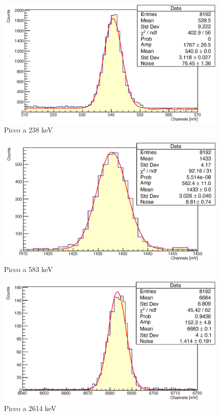 \documentclass[a4paper,10pt]{article}
\begin{document}
\begin{figure}[H]
    \centering
    \includegraphics[scale=0.45]{appendice/spettri/ThCu1_33}
    \caption{Picco a 238 keV}
\end{figure}
\begin{figure}[H]
    \centering
    \includegraphics[scale=0.45]{appendice/spettri/ThCu2_33}
    \caption{Picco a 583 keV}
\end{figure}
\begin{figure}[H]
    \centering
    \includegraphics[scale=0.45]{appendice/spettri/ThCu3_33}
    \caption{Picco a 2614 keV}
\end{figure}
\end{document}
